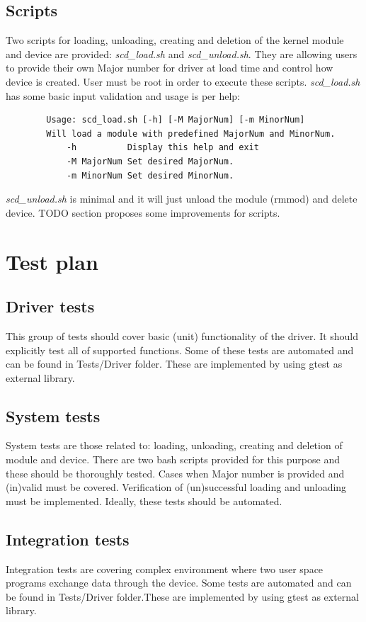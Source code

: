 \documentclass[11pt]{report}
\begin{document}
\subsection{Scripts}
Two scripts for loading, unloading, creating and deletion of the kernel module and device are provided: \emph{scd\_load.sh} and \emph{scd\_unload.sh}. They are allowing users to provide their own Major number for driver at load time and control how device is created. User must be root in order to execute these scripts. \emph{scd\_load.sh} has some basic input validation and usage is per help: 
\begin{verbatim}
		Usage: scd_load.sh [-h] [-M MajorNum] [-m MinorNum]
		Will load a module with predefined MajorNum and MinorNum.
       		-h          Display this help and exit
       		-M MajorNum Set desired MajorNum.
       		-m MinorNum Set desired MinorNum.
\end{verbatim}
\emph{scd\_unload.sh} is minimal and it will just unload the module (rmmod) and delete device.
TODO section proposes some improvements for scripts.

\section{Test plan}
\subsection {Driver tests}
This group of tests should cover basic (unit) functionality of the driver. It should explicitly test all of supported functions. Some of these tests are automated and can be found in Tests/Driver folder. These are implemented by using gtest as external library. 

\subsection {System tests}
System tests are those related to: loading, unloading, creating and deletion of module and device. There are two bash scripts provided for this purpose and these should be thoroughly tested. Cases when Major number is provided and (in)valid must be covered. Verification of (un)successful loading and unloading must be implemented. Ideally, these tests should be automated. 

\subsection {Integration tests}
Integration tests are covering complex environment where two user space programs exchange data through the device. Some tests are automated and can be found in Tests/Driver folder.These are implemented by using gtest as external library.
\end{document}
